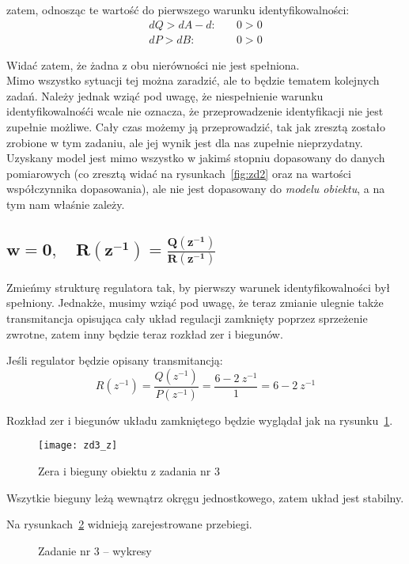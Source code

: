 \documentclass[11pt, a4paper]{article}
\begin{document}
zatem, odnosząc te wartość do pierwszego warunku identyfikowalności:
\begin{align*}
	dQ > dA - d:& \quad 0 > 0 \\
	dP > dB:& \quad 0 > 0
\end{align*}

Widać zatem, że żadna z obu nierówności nie jest spełniona.\\

Mimo wszystko sytuacji tej można zaradzić, ale to będzie tematem kolejnych zadań. Należy jednak wziąć pod uwagę, że niespełnienie warunku identyfikowalnośći wcale nie oznacza, że przeprowadzenie identyfikacji nie jest zupełnie możliwe. Cały czas możemy ją przeprowadzić, tak jak zresztą zostało zrobione w tym zadaniu, ale jej wynik jest dla nas zupełnie nieprzydatny. Uzyskany model jest mimo wszystko w jakimś stopniu dopasowany do danych pomiarowych (co zresztą widać na rysunkach~\ref{fig:zd2} oraz na wartości współczynnika dopasowania), ale nie jest dopasowany do \emph{modelu obiektu}, a na tym nam właśnie zależy.

\subsection{$\displaystyle \mathbf{w = 0, \quad R(z^{-1}) = \frac{Q(z^{-1})}{R(z^{-1})}}$}

Zmieńmy strukturę regulatora tak, by pierwszy warunek identyfikowalności był spełniony. Jednakże, musimy wziąć pod uwagę, że teraz zmianie ulegnie także transmitancja opisująca cały układ regulacji zamknięty poprzez sprzeżenie zwrotne, zatem inny będzie teraz rozkład zer i biegunów.

Jeśli regulator będzie opisany transmitancją:
\[
	 R(z^{-1}) = \frac{Q(z^{-1})}{P(z^{-1})} = \frac{6 - 2 \ z^{-1}}{1} = 6 - 2 \ z^{-1}
\]

Rozkład zer i biegunów układu zamkniętego będzie wyglądał jak na rysunku~\ref{fig:zd3_z}.
\begin{figure}[htbp!]
	\centering
	\texttt{[image: zd3\_z]}
	\caption{Zera i bieguny obiektu z zadania nr 3}
	\label{fig:zd3_z}
\end{figure}

Wszytkie bieguny leżą wewnątrz okręgu jednostkowego, zatem układ jest stabilny.

Na rysunkach~\ref{fig:zd3} widnieją zarejestrowane przebiegi.
\begin{figure}[htbp!]
	\centering
	\hfill%
	\caption{Zadanie nr 3 -- wykresy}
	\label{fig:zd3}
\end{figure}
\end{document}
